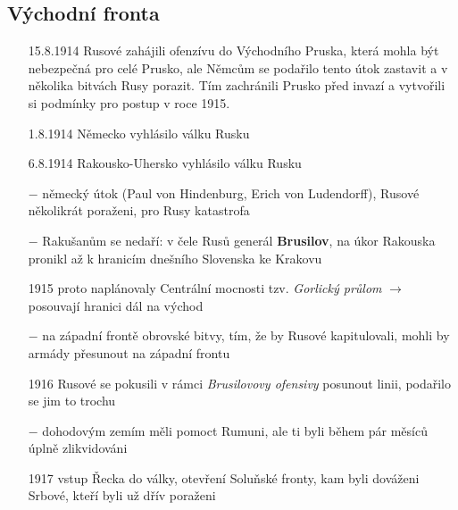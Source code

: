 \documentclass{article}
\begin{document}
\subsection*{Východní fronta}
\begin{itemize}
    \vspace{-0.5em}
    \setlength\itemsep{0.15em}
    \item[15.8.1914] Rusové zahájili ofenzívu do Východního Pruska, která mohla být nebezpečná pro celé Prusko, ale Němcům se podařilo tento útok zastavit a v několika bitvách Rusy porazit. Tím zachránili Prusko před invazí a vytvořili si podmínky pro postup v roce 1915.
    \item[1.8.1914] Německo vyhlásilo válku Rusku
    \item[6.8.1914] Rakousko-Uhersko vyhlásilo válku Rusku
    \item[$-$] německý útok (Paul von Hindenburg, Erich von Ludendorff), Rusové několikrát poraženi, pro Rusy katastrofa
    \item[$-$] Rakušanům se nedaří: v čele Rusů generál \textbf{Brusilov}, na úkor Rakouska pronikl až k hranicím dnešního Slovenska ke Krakovu
    \item[1915] proto naplánovaly Centrální mocnosti tzv. \textit{Gorlický průlom} $\rightarrow$ posouvají hranici dál na východ
    \item[$-$] na západní frontě obrovské bitvy, tím, že by Rusové kapitulovali, mohli by armády přesunout na západní frontu
    \item[1916] Rusové se pokusili v rámci \textit{Brusilovovy ofensivy} posunout linii, podařilo se jim to trochu
    \item[$-$] dohodovým zemím měli pomoct Rumuni, ale ti byli během pár měsíců úplně zlikvidováni
    \item[1917] vstup Řecka do války, otevření Soluňské fronty, kam byli dováženi Srbové, kteří byli už dřív poraženi
\end{itemize}
\end{document}
